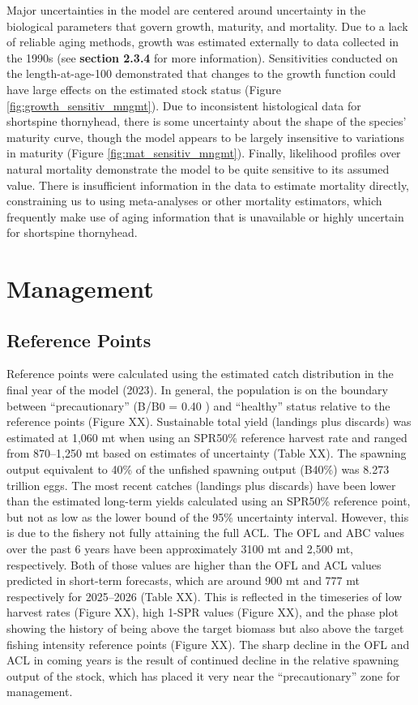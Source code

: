 \documentclass[11pt,
  english,
  letterpaper,
]{article}
\begin{document}
Major uncertainties in the model are centered around uncertainty in the biological parameters that govern growth, maturity, and mortality. Due to a lack of reliable aging methods, growth was estimated externally to data collected in the 1990s (see \textbf{section 2.3.4} for more information). Sensitivities conducted on the length-at-age-100 demonstrated that changes to the growth function could have large effects on the estimated stock status (Figure \ref{fig:growth_sensitiv_mngmt}). Due to inconsistent histological data for shortspine thornyhead, there is some uncertainty about the shape of the species' maturity curve, though the model appears to be largely insensitive to variations in maturity (Figure \ref{fig:mat_sensitiv_mngmt}). Finally, likelihood profiles over natural mortality demonstrate the model to be quite sensitive to its assumed value. There is insufficient information in the data to estimate mortality directly, constraining us to using meta-analyses or other mortality estimators, which frequently make use of aging information that is unavailable or highly uncertain for shortspine thornyhead.

\hypertarget{management}{%
\section{Management}\label{management}}

\hypertarget{reference-points-1}{%
\subsection{Reference Points}\label{reference-points-1}}

Reference points were calculated using the estimated catch distribution in the final year of the model (2023). In general, the population is on the boundary between ``precautionary'' (B/B0 = 0.40 ) and ``healthy'' status relative to the reference points (Figure XX). Sustainable total yield (landings plus discards) was estimated at 1,060 mt when using an SPR50\% reference harvest rate and ranged from 870--1,250 mt based on estimates of uncertainty (Table XX). The spawning output equivalent to 40\% of the unfished spawning output (B40\%) was 8.273 trillion eggs. The most recent catches (landings plus discards) have been lower than the estimated long-term yields calculated using an SPR50\% reference point, but not as low as the lower bound of the 95\% uncertainty interval. However, this is due to the fishery not fully attaining the full ACL. The OFL and ABC values over the past 6 years have been approximately 3100 mt and 2,500 mt, respectively. Both of those values are higher than the OFL and ACL values predicted in short-term forecasts, which are around 900 mt and 777 mt respectively for 2025--2026 (Table XX). This is reflected in the timeseries of low harvest rates (Figure XX), high 1-SPR values (Figure XX), and the phase plot showing the history of being above the target biomass but also above the target fishing intensity reference points (Figure XX). The sharp decline in the OFL and ACL in coming years is the result of continued decline in the relative spawning output of the stock, which has placed it very near the ``precautionary'' zone for management.
\end{document}
